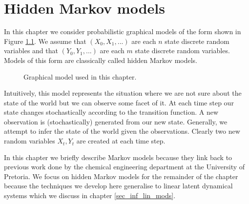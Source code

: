 \chapter{Hidden Markov models}
\label{sec_hmm}
In this chapter we consider probabilistic graphical models of the form shown in Figure \ref{fig_linmod}. We assume that  $(X_0, X_1,...)$ are each $n$ state discrete random variables and that $(Y_0, Y_1,...)$ are each $m$ state discrete random variables. Models of this form are classically called hidden Markov models.
\begin{figure}[H] 
\centering
{}
\caption{Graphical model used in this chapter.}
\label{fig_linmod}
\end{figure}
Intuitively, this model represents the situation where we are not sure about the state of the world but we can observe some facet of it. At each time step our state changes stochastically according to the transition function. A new observation is (stochastically) generated from our new state. Generally, we attempt to infer the state of the world given the observations. Clearly two new random variables $X_t, Y_t$ are created at each time step.

In this chapter we briefly describe Markov models because they link back to previous work done by the chemical engineering department at the University of Pretoria. We focus on hidden Markov models for the remainder of the chapter because the techniques we develop here generalise to linear latent dynamical systems which we discuss in chapter \ref{sec_inf_lin_mods}. 

